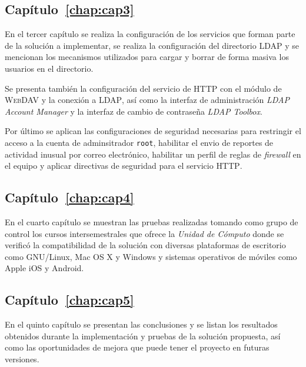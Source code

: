 \newpage
    \subsection*{Cap\'{i}tulo~\ref{chap:cap3}}

En el tercer cap\'{i}tulo se realiza la configuraci\'{o}n de los servicios que forman parte de la soluci\'{o}n a implementar, se realiza la configuraci\'{o}n del directorio \textsc{LDAP} y se mencionan los mecanismos utilizados para cargar y borrar de forma masiva los usuarios en el directorio.

Se presenta tambi\'{e}n la configuraci\'{o}n del servicio de \textsc{HTTP} con el m\'{o}dulo de \textsc{WebDAV} y la conexi\'{o}n a \textsc{LDAP}, as\'{i} como la interfaz de administraci\'{o}n \textit{LDAP Account Manager} y la interfaz de cambio de contrase\~{n}a \textit{LDAP Toolbox}.

Por \'{u}ltimo se aplican las configuraciones de seguridad necesarias para restringir el acceso a la cuenta de adminsitrador \texttt{root}, habilitar el envio de reportes de actividad inusual por correo electr\'{o}nico, habilitar un perfil de reglas de \textit{firewall} en el equipo y aplicar directivas de seguridad para el servicio \textsc{HTTP}.

    \subsection*{Cap\'{i}tulo~\ref{chap:cap4}}

En el cuarto cap\'{i}tulo se muestran las pruebas realizadas tomando como grupo de control los cursos intersemestrales que ofrece la \textsl{Unidad de C\'{o}mputo} donde se verific\'{o} la compatibilidad de la soluci\'{o}n con diversas plataformas de escritorio como GNU/Linux, Mac OS X y Windows y sistemas operativos de m\'{o}viles como Apple iOS y Android.

    \subsection*{Cap\'{i}tulo~\ref{chap:cap5}}

En el quinto cap\'{i}tulo se presentan las conclusiones y se listan los resultados obtenidos durante la implementaci\'{o}n y pruebas de la soluci\'{o}n propuesta, as\'{i} como las oportunidades de mejora que puede tener el proyecto en futuras versiones.

